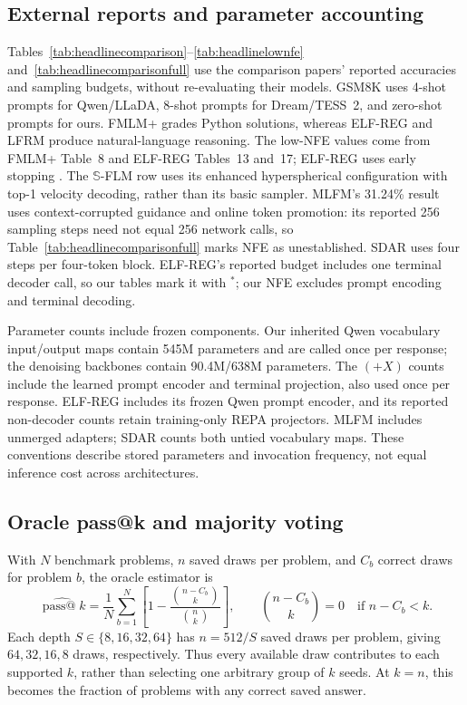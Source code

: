 \documentclass{article}
\begin{document}
\subsection{External reports and parameter accounting}
Tables~\ref{tab:headlinecomparison}--\ref{tab:headlinelownfe} and~\ref{tab:headlinecomparisonfull} use the comparison papers' reported accuracies and sampling budgets, without re-evaluating their models. GSM8K uses 4-shot prompts for Qwen/LLaDA, 8-shot prompts for Dream/TESS~2, and zero-shot prompts for ours. FMLM+ grades Python solutions, whereas ELF-REG and LFRM produce natural-language reasoning. The low-NFE values come from FMLM+ Table~8 and ELF-REG Tables~13 and~17; ELF-REG uses early stopping \citep{posterior,scalingdlm}. The $\mathbb S$-FLM row uses its enhanced hyperspherical configuration with top-1 velocity decoding, rather than its basic sampler. MLFM's 31.24\% result uses context-corrupted guidance and online token promotion: its reported 256 sampling steps need not equal 256 network calls, so Table~\ref{tab:headlinecomparisonfull} marks NFE as unestablished. SDAR uses four steps per four-token block. ELF-REG's reported budget includes one terminal decoder call, so our tables mark it with $^{*}$; our NFE excludes prompt encoding and terminal decoding.

Parameter counts include frozen components. Our inherited Qwen vocabulary input/output maps contain 545M parameters and are called once per response; the denoising backbones contain 90.4M/638M parameters. The $(+X)$ counts include the learned prompt encoder and terminal projection, also used once per response. ELF-REG includes its frozen Qwen prompt encoder, and its reported non-decoder counts retain training-only REPA projectors. MLFM includes unmerged adapters; SDAR counts both untied vocabulary maps. These conventions describe stored parameters and invocation frequency, not equal inference cost across architectures.

\subsection{Oracle pass@k and majority voting}
\label{app:passkprotocol}

With $N$ benchmark problems, $n$ saved draws per problem, and $C_b$ correct draws for problem $b$, the oracle estimator is
\begin{equation}
 \widehat{\operatorname{pass@}k}
 =\frac{1}{N}\sum_{b=1}^{N}
 \left[1-\frac{\binom{n-C_b}{k}}{\binom{n}{k}}\right],
 \qquad \binom{n-C_b}{k}=0\quad\text{if }n-C_b<k.
\end{equation}
Each depth $S\in\{8,16,32,64\}$ has $n=512/S$ saved draws per problem, giving $64,32,16,8$ draws, respectively. Thus every available draw contributes to each supported $k$, rather than selecting one arbitrary group of $k$ seeds. At $k=n$, this becomes the fraction of problems with any correct saved answer.
\end{document}
